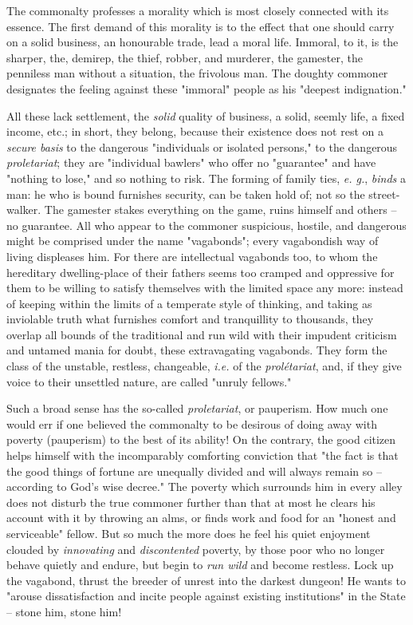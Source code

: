 The commonalty professes a morality which is most closely connected with its 
essence. The first demand of this morality is to the effect that one should 
carry on a solid business, an honourable trade, lead a moral life. Immoral, to 
it, is the sharper, the, demirep, the thief, robber, and murderer, the 
gamester, the penniless man without a situation, the frivolous man. The 
doughty commoner designates the feeling against these "{}immoral"{} people as 
his "{}deepest indignation."{}

All these lack settlement, the \textit{solid} quality of business, a solid, 
seemly life, a fixed income, etc.; in short, they belong, because their 
existence does not rest on a \textit{secure basis} to the dangerous 
"{}individuals or isolated persons,"{} to the dangerous \textit{proletariat}; 
they are "{}individual bawlers"{} who offer no "{}guarantee"{} and have 
"{}nothing to lose,"{} and so nothing to risk. The forming of family ties, 
\textit{e. g.}, \textit{binds} a man: he who is bound furnishes security, can 
be taken hold of; not so the street-walker. The gamester stakes everything on 
the game, ruins himself and others -- no guarantee. All who appear to the 
commoner suspicious, hostile, and dangerous might be comprised under the name 
"{}vagabonds"{}; every vagabondish way of living displeases him. For there are 
intellectual vagabonds too, to whom the hereditary dwelling-place of their 
fathers seems too cramped and oppressive for them to be willing to satisfy 
themselves with the limited space any more: instead of keeping within the 
limits of a temperate style of thinking, and taking as inviolable truth what 
furnishes comfort and tranquillity to thousands, they overlap all bounds of 
the traditional and run wild with their impudent criticism and untamed mania 
for doubt, these extravagating vagabonds. They form the class of the unstable, 
restless, changeable, \textit{i.e.} of the \textit{prol\'etariat}, and, if 
they give voice to their unsettled nature, are called "{}unruly fellows."{}

Such a broad sense has the so-called \textit{proletariat}, or pauperism. How 
much one would err if one believed the commonalty to be desirous of doing away 
with poverty (pauperism) to the best of its ability! On the contrary, the good 
citizen helps himself with the incomparably comforting conviction that "{}the 
fact is that the good things of fortune are unequally divided and will always 
remain so -- according to God's wise decree."{} The poverty which surrounds 
him in every alley does not disturb the true commoner further than that at 
most he clears his account with it by throwing an alms, or finds work and food 
for an "{}honest and serviceable"{} fellow. But so much the more does he feel 
his quiet enjoyment clouded by \textit{innovating} and \textit{discontented} 
poverty, by those poor who no longer behave quietly and endure, but begin to 
\textit{run wild} and become restless. Lock up the vagabond, thrust the 
breeder of unrest into the darkest dungeon! He wants to "{}arouse 
dissatisfaction and incite people against existing institutions"{} in the 
State -- stone him, stone him!

